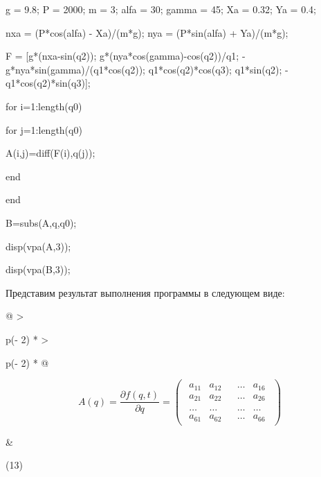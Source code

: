 g = 9.8; P = 2000; m = 3; alfa = 30; gamma = 45; Xa = 0.32; Ya = 0.4;

nxa = (P*cos(alfa) - Xa)/(m*g); nya = (P*sin(alfa) + Ya)/(m*g);

F = {[}g*(nxa-sin(q2)); g*(nya*cos(gamma)-cos(q2))/q1;
-g*nya*sin(gamma)/(q1*cos(q2)); q1*cos(q2)*cos(q3); q1*sin(q2);
-q1*cos(q2)*sin(q3){]};

for i=1:length(q0)

for j=1:length(q0)

A(i,j)=diff(F(i),q(j));

end

end

B=subs(A,q,q0);

disp(vpa(A,3));

disp(vpa(B,3));

Представим результат выполнения программы в следующем виде:

\begin{longtable}[]{@{}
  >{\raggedright\arraybackslash}p{(\columnwidth - 2\tabcolsep) * }
  >{\raggedright\arraybackslash}p{(\columnwidth - 2\tabcolsep) * }@{}}
\toprule\noalign{}
\begin{minipage}[b]{\linewidth}\raggedright
\[A(q) = \frac{\partial f(q,t)}{\partial q} = \begin{pmatrix}
\begin{matrix}
a_{11} & a_{12} \\
a_{21} & a_{22}
\end{matrix} & \begin{matrix}
\ldots & a_{16} \\
\ldots & a_{26}
\end{matrix} \\
\begin{matrix}
\ldots & \ldots \\
a_{61} & a_{62}
\end{matrix} & \begin{matrix}
\ldots & \ldots \\
\ldots & a_{66}
\end{matrix}
\end{pmatrix}\]
\end{minipage} & \begin{minipage}[b]{\linewidth}\raggedright
(13)
\end{minipage} \\
\midrule\noalign{}
\endhead
\bottomrule\noalign{}
\endlastfoot
\end{longtable}

